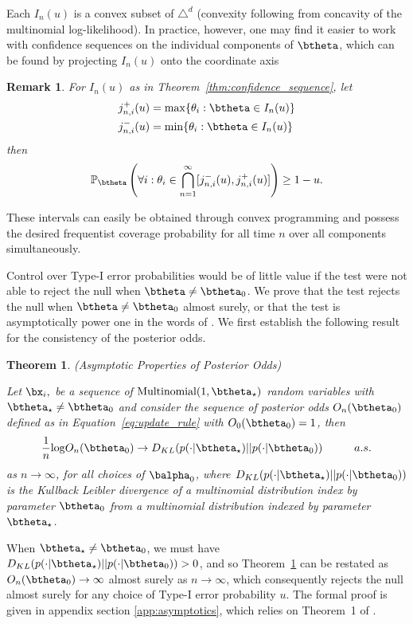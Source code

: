 \documentclass[11pt]{article}
\def\log{{\rm log}}
\newtheorem{thm}{Theorem}[section]
\newtheorem{remark}{Remark}[section]
\begin{document}
\noindent Each $I_n(u)$ is a convex subset of $\triangle^d$ (convexity following from concavity of the multinomial log-likelihood). 
In practice, however, one may find it easier to work with confidence sequences on the individual components of $\btheta$, which can be found by projecting $I_n(u)$ onto the coordinate axis
\begin{remark}

\noindent For $I_n(u)$ as in Theorem~\ref{thm:confidence_sequence}, let
\begin{align*}
j_{n,i}^+(u) &= \max \{\theta_i : \btheta \in I_n(u)\}\\
j_{n,i}^-(u) &= \min \{\theta_i : \btheta \in I_n(u)\}\\
\end{align*}
then 
\begin{equation}
  \label{eq:marginal_confidence_sequence}
  \mathbb{P}_{\btheta}\left(
    \forall i: \theta_i \in \bigcap_{n=1}^{\infty} [j_{n,i}^-(u),j_{n,i}^+(u)]
  \right) \geq 1- u.
\end{equation} 
\end{remark}
\noindent These intervals can easily be obtained through convex programming and possess the desired frequentist coverage probability for all time $n$ over all components simultaneously.

Control over Type-I error probabilities would be of little value if the test were not able to reject the null when $\btheta \neq \btheta_0$. We prove that the test rejects the null when $\btheta \neq \btheta_0$ almost surely, or that the test is asymptotically power one in the words of \cite{robbins}.
We first establish the following result for the consistency of the posterior odds.
\begin{thm}(Asymptotic Properties of Posterior Odds)
  
  \label{thm:consistency}
\noindent Let $\bx_i,$ be a sequence of $\text{Multinomial}(1,\btheta_{\star})$ random variables with $\btheta_{\star} \neq \btheta_0$ and consider the sequence of posterior odds $O_n(\btheta_0)$ defined as in Equation~\ref{eq:update_rule} with $O_0(\btheta_0)=1$, then
\begin{equation}
  \label{eq:consistency}
  \frac{1}{n} \log O_n(\btheta_0) \rightarrow D_{KL}(p(\cdot|\btheta_{\star}) || p(\cdot|\btheta_0)) \hspace{1cm} a.s.
\end{equation}
as $ n \rightarrow \infty$, for all choices of $\balpha_0$, where $D_{KL}(p(\cdot|\btheta_{\star}) || p(\cdot|\btheta_0))$ is the Kullback Leibler divergence of a multinomial distribution index by parameter $\btheta_0$ from a multinomial distribution indexed by parameter $\btheta_{\star}$.
\end{thm}
\noindent When $\btheta_{\star} \neq \btheta_0$, we must have $D_{KL}(p(\cdot|\btheta_{\star}) || p(\cdot|\btheta_0)) > 0$, and so Theorem~\ref{thm:consistency} can be restated as $O_n(\btheta_0) \rightarrow \infty$ almost surely as $ n \rightarrow \infty$, which consequently rejects the null almost surely for any choice of Type-I error probability $u$.
The formal proof is given in appendix section \ref{app:asymptotics}, which relies on Theorem~1 of \cite{walker}.
\end{document}
